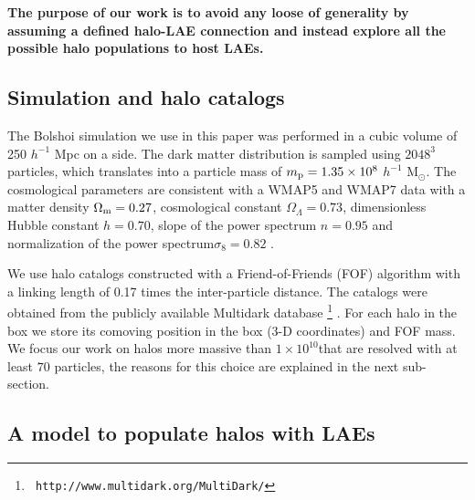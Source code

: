 \documentclass[usenatbib]{mn2e}
\newcommand{\hMsun}{{\ifmmode{h^{-1}{\rm
        {M_{\odot}}}}\else{$h^{-1}{\rm{M_{\odot}}}$}\fi}}
\begin{document}
{{\bf The purpose of our work is to avoid any loose of generality by
  assuming a defined halo-LAE connection and instead explore all the
  possible halo populations to host LAEs.}


\subsection{Simulation and halo catalogs}

The Bolshoi simulation \citep{Bolshoi} we use in this paper was
performed in a cubic volume of 250 $h^{-1}$ Mpc on a side. The
dark matter distribution is sampled using $2048^{3}$ particles, which
translates into a particle mass of $m_{\rm   p}=1.35\times 10^{8}$
$h^{-1}$ M$_{\odot}$.  The cosmological parameters are consistent with
a WMAP5 and WMAP7 data with a matter density $\Omega_{\rm m} = 0.27$,
cosmological constant $\Omega_{\Lambda}=0.73$, dimensionless Hubble constant
$h=0.70$, slope of the power spectrum $n=0.95$ and normalization of the
power spectrum$\sigma_{8}=0.82$ \citep{Komatsu2009,Jarosik2011}.  

We use halo catalogs constructed with a Friend-of-Friends (FOF)
algorithm with a linking length of 0.17 times the inter-particle
distance. The catalogs were obtained from the publicly available
Multidark database \footnote{{\tt
    http://www.multidark.org/MultiDark/}}
\citep{MultiDark}. For each halo in the box we store its
comoving position in the box (3-D coordinates) and FOF mass. We focus our work
on halos more massive than $1\times 10^{10}$\hMsun that are resolved
with at least $70$ particles, the reasons for this choice are
explained in the next sub-section.  


\subsection{A model to populate halos with LAEs}
\label{subsec:mocks}



}
\end{document}
